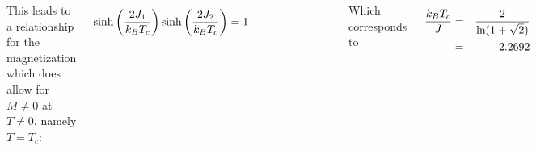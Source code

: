 \documentclass[hyperref={colorlinks=true}]{beamer}
\begin{document}
\begin{frame}
\begin{columns}
      This leads to a relationship for the magnetization which \alert{does allow for $M\neq0$ at $T\neq0$, namely $T=T_c$}:
      
      \begin{equation}
        \sinh \left( \frac{2 J_1}{k_B T_c} \right) \sinh \left( \frac{2 J_2}{k_B T_c} \right) = 1
      \end{equation}
      
      
      
    
      \begin{figure}
        \centering
        \includegraphics[width=\columnwidth]{OnsagersIsingModel2.pdf}
      \end{figure}
    
      \pause
    
      Which corresponds to
      
      \begin{eqnarray}
         \frac{k_B T_{c}}{J} &=& {\frac {2}{\ln(1+{\sqrt {2}})}} \\
                             &=& 2.2692
      \end{eqnarray}
  
  \end{columns}  
  
\end{frame}
\end{document}
